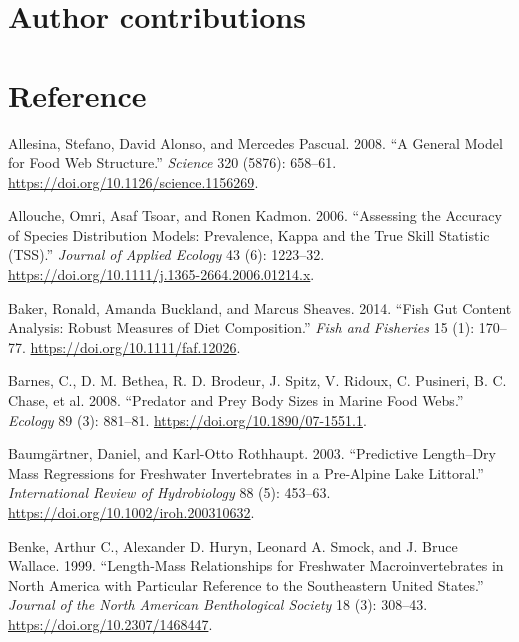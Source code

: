 \documentclass{article}
\newlength{\cslhangindent}
\newlength{\cslentryspacingunit} %
\newenvironment{CSLReferences}[2] %
 {%
  \setlength{\parindent}{0pt}
  \ifodd #1
  \let\oldpar\par
  \def\par{\hangindent=\cslhangindent\oldpar}
  \fi
  \setlength{\parskip}{#2\cslentryspacingunit}
 }%
 {}
\begin{document}
\hypertarget{author-contributions}{%
\section{Author contributions}\label{author-contributions}}

\hypertarget{reference}{%
\section*{Reference}\label{reference}}

\hypertarget{refs}{}
\begin{CSLReferences}{1}{0}
\leavevmode{}%
Allesina, Stefano, David Alonso, and Mercedes Pascual. 2008. {``A
{General Model} for {Food Web Structure}.''} \emph{Science} 320 (5876):
658--61. \url{https://doi.org/10.1126/science.1156269}.

\leavevmode{}%
Allouche, Omri, Asaf Tsoar, and Ronen Kadmon. 2006. {``Assessing the
Accuracy of Species Distribution Models: Prevalence, Kappa and the True
Skill Statistic ({TSS}).''} \emph{Journal of Applied Ecology} 43 (6):
1223--32. \url{https://doi.org/10.1111/j.1365-2664.2006.01214.x}.

\leavevmode{}%
Baker, Ronald, Amanda Buckland, and Marcus Sheaves. 2014. {``Fish Gut
Content Analysis: Robust Measures of Diet Composition.''} \emph{Fish and
Fisheries} 15 (1): 170--77. \url{https://doi.org/10.1111/faf.12026}.

\leavevmode{}%
Barnes, C., D. M. Bethea, R. D. Brodeur, J. Spitz, V. Ridoux, C.
Pusineri, B. C. Chase, et al. 2008. {``Predator and {Prey Body Sizes} in
{Marine Food Webs}.''} \emph{Ecology} 89 (3): 881--81.
\url{https://doi.org/10.1890/07-1551.1}.

\leavevmode{}%
Baumgärtner, Daniel, and Karl-Otto Rothhaupt. 2003. {``Predictive
{Length}--{Dry Mass Regressions} for {Freshwater Invertebrates} in a
{Pre-Alpine Lake Littoral}.''} \emph{International Review of
Hydrobiology} 88 (5): 453--63.
\url{https://doi.org/10.1002/iroh.200310632}.

\leavevmode{}%
Benke, Arthur C., Alexander D. Huryn, Leonard A. Smock, and J. Bruce
Wallace. 1999. {``Length-{Mass Relationships} for {Freshwater
Macroinvertebrates} in {North America} with {Particular Reference} to
the {Southeastern United States}.''} \emph{Journal of the North American
Benthological Society} 18 (3): 308--43.
\url{https://doi.org/10.2307/1468447}.


\end{CSLReferences}
\end{document}
